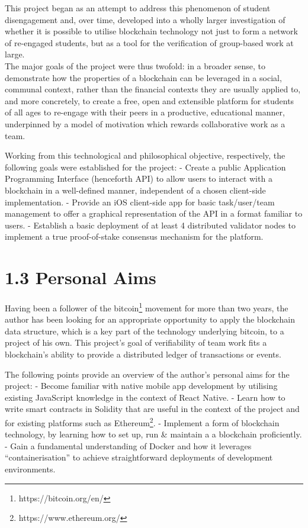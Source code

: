 \documentclass[12pt]{report}
\begin{document}
This project began as an attempt to address this phenomenon of student
disengagement and, over time, developed into a wholly larger
investigation of whether it is possible to utilise blockchain technology
not just to form a network of re-engaged students, but as a tool for the
verification of group-based work at large.\\
The major goals of the project were thus twofold: in a broader sense, to
demonstrate how the properties of a blockchain can be leveraged in a
social, communal context, rather than the financial contexts they are
usually applied to, and more concretely, to create a free, open and
extensible platform for students of all ages to re-engage with their
peers in a productive, educational manner, underpinned by a model of
motivation which rewards collaborative work as a team.

Working from this technological and philosophical objective,
respectively, the following goals were established for the project: -
Create a public Application Programming Interface (henceforth API) to
allow users to interact with a blockchain in a well-defined manner,
independent of a chosen client-side implementation. - Provide an iOS
client-side app for basic task/user/team management to offer a graphical
representation of the API in a format familiar to users. - Establish a
basic deployment of at least 4 distributed validator nodes to implement
a true proof-of-stake consensus
mechanism\cite{BitFuryGroup2015} for the platform.

\section{1.3 Personal Aims}\label{personal-aims}

Having been a follower of the
bitcoin\footnote{https://bitcoin.org/en/} movement for more than
two years, the author has been looking for an appropriate opportunity to
apply the blockchain data structure, which is a key part of the
technology underlying bitcoin, to a project of his own. This project's
goal of verifiability of team work fits a blockchain's ability to
provide a distributed ledger of transactions or events.

The following points provide an overview of the author's personal aims
for the project: - Become familiar with native mobile app development by
utilising existing JavaScript knowledge in the context of React
Native\cite{2react-native}. - Learn how
to write smart contracts in Solidity\cite{1solidity} that are useful
in the context of the project and for existing platforms such as
Ethereum\footnote{https://www.ethereum.org/}. - Implement a form of blockchain
technology, by learning how to set up, run \& maintain a a blockchain
proficiently. - Gain a fundamental understanding of Docker\cite{1docker} and how it leverages ``containerisation'' to achieve
straightforward deployments of development environments.
\end{document}
